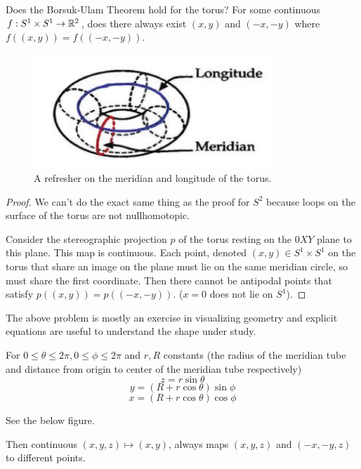 \documentclass[10pt]{article}
\begin{document}
\begin{exercise}[8]
	Does the Borsuk-Ulam Theorem hold for the torus? For some continuous $f: S^1
	\times S^1 \to \mathbb{R}^2$, does there always exist $(x, y)$ and $(-x, -y)$ where $f((x, y)) = f((-x, -y))$.
\end{exercise}

\begin{figure}[ht!]
\centering
\includegraphics[width=90mm]{meridian-longitude-torus.jpeg}
\caption{A refresher on the meridian and longitude of the torus.}
\end{figure}

\begin{proof}
	We can't do the exact same thing as the proof for $S^2$ because loops on the surface of the
	torus are not nullhomotopic.

	Consider the stereographic projection $p$ of the torus resting on the $0XY$
	plane to this plane. This map is continuous. Each point, denoted $(x, y) \in
	S^1 \times S^1$ on the torus that share an image on the plane must lie on the same meridian
	circle, so must share the first coordinate. Then there cannot be antipodal points
	that satisfy $p((x, y)) = p((-x, -y))$. ($x = 0$ does not lie on $S^1$).
\end{proof}

\begin{note}
The above problem is mostly an exercise in visualizing geometry and explicit
equations are useful to understand the shape under study.

For $0 \leq \theta \leq 2\pi, 0 \leq \phi \leq 2\pi$ and $r, R$ constants
(the radius of the meridian tube and distance from origin to center of the
meridian tube respectively)
\[z = r \sin \theta \]
\[y = (R + r \cos \theta) \sin \phi \]
\[x = (R + r \cos \theta) \cos \phi \]

See the below figure.

Then continuous $(x, y, z) \mapsto (x, y)$, always maps $(x, y, z)$ and $(-x,
-y, z)$ to different points.
\end{note}
\end{document}
